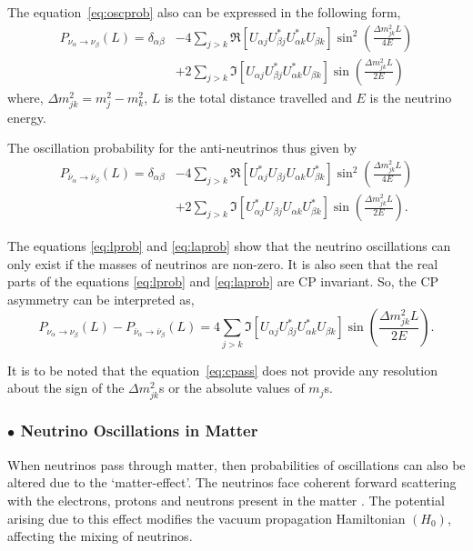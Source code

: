 The equation~\ref{eq:oscprob} also can be expressed in the following
form,
\begin{align}
  P_{\nu_\alpha\rightarrow\nu_\beta}\left(L\right) = \delta_{\alpha\beta} & -4\sum_{j>k}\Re\left[U_{\alpha j}U^{*}_{\beta j}U^{*}_{\alpha k}U_{\beta k}\right]\sin^2\left(\frac{\Delta m^2_{jk}L}{4E}\right) \nonumber\\
  & +2\sum_{j>k}\Im\left[U_{\alpha j}U^{*}_{\beta j}U^{*}_{\alpha k}U_{\beta k}\right]\sin\left(\frac{\Delta m^2_{jk}L}{2E}\right)
  \label{eq:lprob}
\end{align}
where, $\Delta m^2_{jk}=m^2_{j}-m^2_{k}$, $L$ is the total distance
travelled and $E$ is the neutrino energy.

The oscillation probability for the anti-neutrinos thus given by
\begin{align}
  P_{\bar{\nu}_\alpha\rightarrow\bar{\nu}_\beta}\left(L\right) = \delta_{\alpha\beta} & -4\sum_{j>k}\Re\left[U^{*}_{\alpha j}U_{\beta j}U_{\alpha k}U^{*}_{\beta k}\right]\sin^2\left(\frac{\Delta m^2_{jk}L}{4E}\right) \nonumber\\
  & +2\sum_{j>k}\Im\left[U^{*}_{\alpha j}U_{\beta j}U_{\alpha k}U^{*}_{\beta k}\right]\sin\left(\frac{\Delta m^2_{jk}L}{2E}\right).
  \label{eq:laprob}
\end{align}

The equations \ref{eq:lprob} and \ref{eq:laprob} show that the neutrino
oscillations can only exist if the masses of neutrinos are
non-zero. It is also seen that the real parts of the equations
\ref{eq:lprob} and \ref{eq:laprob} are CP invariant. So, the CP
asymmetry can be interpreted as,
\begin{equation}  P_{\nu_\alpha\rightarrow\nu_\beta}\left(L\right)-P_{\bar{\nu}_\alpha\rightarrow\bar{\nu}_\beta}\left(L\right) = 4\sum_{j>k}\Im\left[U_{\alpha j}U^{*}_{\beta j}U^{*}_{\alpha k}U_{\beta k}\right]\sin\left(\frac{\Delta m^2_{jk}L}{2E}\right).
  \label{eq:cpass}
\end{equation}

It is to be noted that the equation~\ref{eq:cpass} does not provide
any resolution about the sign of the $\Delta m_{jk}^{2}$s
or the absolute values of $m_{j}$s.

\subsubsection{$\bullet$ Neutrino Oscillations in Matter}

When neutrinos pass through matter, then probabilities of oscillations
can also be altered due to the `matter-effect'. The neutrinos face
coherent forward scattering with the electrons, protons and neutrons
present in the matter \cite{mattereffect}. The potential arising due to
this effect modifies the vacuum propagation Hamiltonian
$\left(H_{0}\right)$, affecting the mixing of neutrinos.

